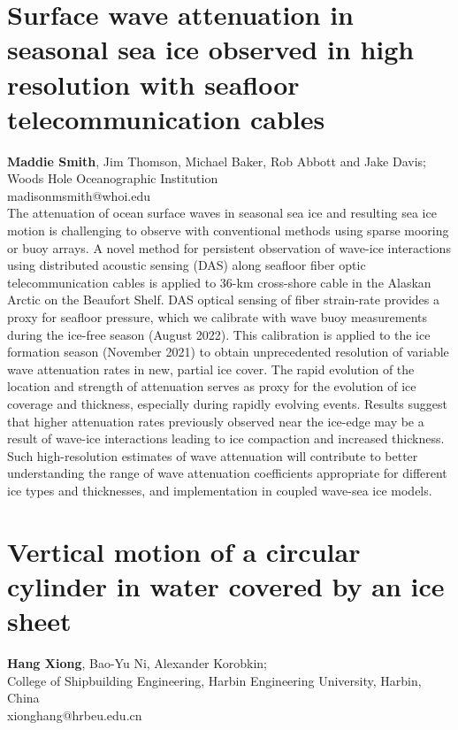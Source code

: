\documentclass[9pt,a4paper,oneside]{book}
\numberwithin{equation}{section}
\begin{document}
\section*{Surface wave attenuation in seasonal sea ice observed in high resolution with seafloor telecommunication cables}
 \label{abs:13}
  {\bf Maddie Smith}, Jim Thomson, Michael Baker, Rob Abbott and Jake Davis;\\
Woods Hole Oceanographic Institution\\
madisonmsmith@whoi.edu\\

The attenuation of ocean surface waves in seasonal sea ice and resulting sea ice motion is challenging to observe with conventional methods using sparse mooring or buoy arrays. A novel method for persistent observation of wave-ice interactions using distributed acoustic sensing (DAS) along seafloor fiber optic telecommunication cables is applied to 36-km cross-shore cable in the Alaskan Arctic on the Beaufort Shelf. DAS optical sensing of fiber strain-rate provides a proxy for seafloor pressure, which we calibrate with wave buoy measurements during the ice-free season (August 2022). This calibration is applied to the ice formation season (November 2021) to obtain unprecedented resolution of variable wave attenuation rates in new, partial ice cover. The rapid evolution of the location and strength of attenuation serves as proxy for the evolution of ice coverage and thickness, especially during rapidly evolving events. Results suggest that higher attenuation rates previously observed near the ice-edge may be a result of wave-ice interactions leading to ice compaction and increased thickness. Such high-resolution estimates of wave attenuation will contribute to better understanding the range of wave attenuation coefficients appropriate for different ice types and thicknesses, and implementation in coupled wave-sea ice models. 

\section*{Vertical motion of a circular cylinder in water covered by an ice sheet}
 \label{abs:14}
  {\bf Hang Xiong}, Bao-Yu Ni, Alexander Korobkin;\\
College of Shipbuilding Engineering, Harbin Engineering University, Harbin, China\\
xionghang@hrbeu.edu.cn\\
\end{document}
